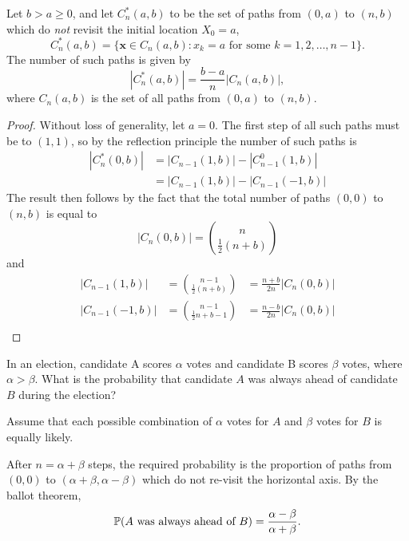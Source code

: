 \begin{theorem}
Let $b>a\geq 0$, and let $C^{*}_n(a,b)$ to be the set of paths from $(0,a)$ to $(n,b)$ which do \emph{not} revisit the initial location $X_0=a$, 
\[
C^{*}_n(a,b) = \big\{\mathbf{x}\in C_n(a,b): x_k=a \text{ for some } k=1,2,\ldots,n-1\}.
\]
The number of such paths is given by
\[
|C^{*}_n(a,b)| = \frac{b-a}{n} |C_n(a,b)|,
\]
where $C_n(a,b)$ is the set of all paths from $(0,a)$ to $(n,b)$.
\end{theorem}

\begin{proof}
Without loss of generality, let $a=0$. The first step of all such paths must be to $(1,1)$, so by the reflection principle the number of such paths is
\begin{align*}
|C^{*}_n(0,b)|
	& = |C_{n-1}(1,b)| - |C^0_{n-1}(1,b)| \\
	& = |C_{n-1}(1,b)| - |C_{n-1}(-1,b)|
\end{align*}
The result then follows by the fact that the total number of paths $(0,0)$ to $(n,b)$ is equal to
\[
|C_n(0,b)| = \binom{n}{\frac{1}{2}(n+b)}
\]
and
\[
\begin{array}{lll}
|C_{n-1}(1,b)| 	& = \binom{n-1}{\frac{1}{2}(n+b)} 	& = \frac{n+b}{2n} |C_n(0,b)| \\
|C_{n-1}(-1,b)|	& = \binom{n-1}{\frac{1}{2}n+b-1}	& = \frac{n-b}{2n} |C_n(0,b)| \\
\end{array}
\]
\end{proof}

\begin{example}
In an election, candidate A scores $\alpha$ votes and candidate B scores $\beta$ votes, where $\alpha > \beta$. What is the probability that candidate $A$ was always ahead of candidate $B$ during the election? 
\begin{solution}
Assume that each possible combination of $\alpha$ votes for $A$ and $\beta$ votes for $B$ is equally likely.

\bigskip
After $n=\alpha+\beta$ steps, the required probability is the proportion of paths from $(0,0)$ to $(\alpha+\beta,\alpha-\beta)$ which do not re-visit the horizontal axis. By the ballot theorem, 
\[
\mathbb{P}(\text{$A$ was always ahead of $B$}) = \frac{\alpha-\beta}{\alpha+\beta}.
\]
\end{solution}
\end{example}


